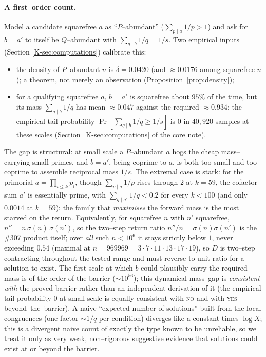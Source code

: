 \documentclass[11pt]{article}
\theoremstyle{definition}
\begin{document}
\paragraph{A first--order count.}
Model a candidate squarefree $a$ as ``$P$--abundant'' ($\sum_{p\mid a}1/p>1$) and ask for
$b=a'$ to itself be $Q$--abundant with $\sum_{q\mid b}1/q=1/s$. Two empirical inputs (Section
\ref{K-sec:computations}) calibrate this:
\begin{itemize}[leftmargin=1.4em]
\item the density of $P$--abundant $n$ is $\delta=0.0420$ (and $\approx0.0176$ among squarefree
$n$); a theorem, not merely an observation (Proposition~\ref{prop:density});
\item for a qualifying squarefree $a$, $b=a'$ is squarefree about $95\%$ of the time, but its mass
$\sum_{q\mid b}1/q$ has mean $\approx0.047$ against the required $\approx0.934$; the empirical tail
probability $\Pr[\sum_{q\mid b}1/q\ge 1/s]$ is $0$ in $40{,}920$ samples at these scales
(Section~\ref{K-sec:computations} of the core note).
\end{itemize}
The gap is structural: at small scale a $P$--abundant $a$ hogs the cheap mass--carrying small primes,
and $b=a'$, being coprime to $a$, is both too small and too coprime to assemble reciprocal mass
$1/s$. The extremal case is stark: for the primorial $a=\prod_{i\le k}p_i$, though $\sum_{p\mid a}1/p$
rises through $2$ at $k=59$, the cofactor sum $a'$ is essentially prime, with $\sum_{q\mid a'}1/q<0.2$
for every $k<100$ (and only $0.0014$ at $k=59$): the family that \emph{maximises} the forward mass is
the most starved on the return. Equivalently, for squarefree $n$ with $n'$ squarefree,
$n''=n\,\sigma(n)\,\sigma(n')$, so the two--step return ratio $n''/n=\sigma(n)\sigma(n')$ is the \#307
product itself; over \emph{all} such $n<10^6$ it stays strictly below $1$, never exceeding $0.54$
(maximal at $n=969969=3\cdot7\cdot11\cdot13\cdot17\cdot19$), so $D$ is two--step contracting throughout
the tested range and must reverse to unit ratio for a solution to exist. The first scale at which $b$
could plausibly carry the required mass is of the order of the
barrier ($\sim10^{56}$); this dynamical mass--gap is \emph{consistent with} the proved barrier rather
than an independent derivation of it (the empirical tail probability $0$ at small scale is equally
consistent with \textsc{no} and with \textsc{yes}--beyond--the--barrier). A naive ``expected number
of solutions'' built from the local congruences (one factor $\sim1/q$ per condition) diverges like a
constant times $\log X$; this is a divergent naive count of exactly the type known to be unreliable,
so we treat it only as very weak, non--rigorous suggestive evidence that solutions could exist at or
beyond the barrier.
\end{document}
